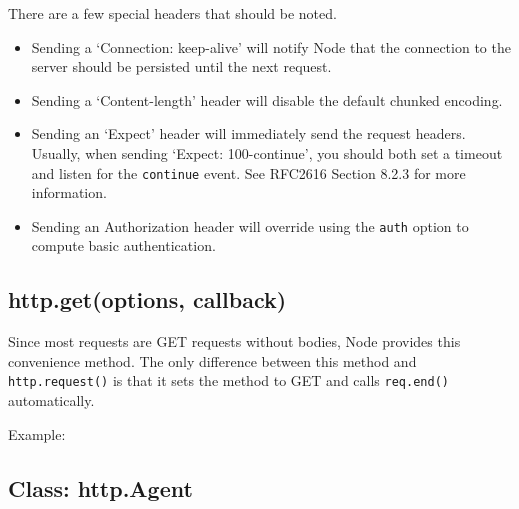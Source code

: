 There are a few special headers that should be noted.

\begin{itemize}
\item
  Sending a `Connection: keep-alive' will notify Node that the
  connection to the server should be persisted until the next request.
\item
  Sending a `Content-length' header will disable the default chunked
  encoding.
\item
  Sending an `Expect' header will immediately send the request headers.
  Usually, when sending `Expect: 100-continue', you should both set a
  timeout and listen for the \texttt{continue} event. See RFC2616
  Section 8.2.3 for more information.
\item
  Sending an Authorization header will override using the \texttt{auth}
  option to compute basic authentication.
\end{itemize}

\subsection{http.get(options, callback)}

Since most requests are GET requests without bodies, Node provides this
convenience method. The only difference between this method and
\texttt{http.request()} is that it sets the method to GET and calls
\texttt{req.end()} automatically.

Example:

\begin{Shaded}
\begin{Highlighting}[]
\NormalTok{(}\NormalTok{, }
  \NormalTok{(} \NormalTok{+ }\NormalTok{);}
\NormalTok{(}\NormalTok{, }
  \NormalTok{(} \NormalTok{+ }\NormalTok{);}
\NormalTok{\});}
\end{Highlighting}
\end{Shaded}

\subsection{Class: http.Agent}

